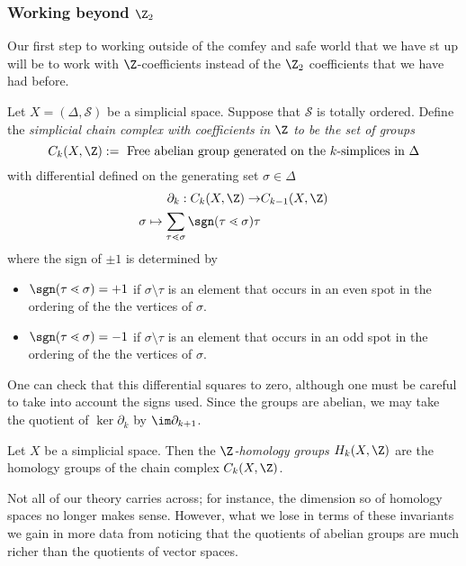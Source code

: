 \begin{example}
\end{example}
\subsubsection{Working beyond $\Z_2$}
Our first step to working outside of the comfey and safe world that we have st up will be to work with $\Z$-coefficients instead of the $\Z_2$ coefficients that we have had before. 
\begin{definition}
Let $X=(\Delta, \mathcal S)$ be a simplicial space. Suppose that $\mathcal S$ is totally ordered.  Define the \emph{simplicial chain complex with coefficients in $\Z$ to be the set of groups}
\[C_k(X, \Z):= \text{ Free abelian group generated on the $k$-simplices in $\Delta$}\]
with differential defined on the generating set  $\sigma\in \Delta$
\begin{align*}
\partial_k: C_k(X, \Z)\to& C_{k-1}(X, \Z)\\
\sigma \mapsto \sum_{\tau\lessdot \sigma} \sgn(\tau\lessdot \sigma)\tau
\end{align*}
where the sign of $\pm1$ is determined by 
\begin{itemize}
\item $\sgn(\tau\lessdot\sigma)=+1$ if $\sigma\setminus \tau$ is an element that occurs in an even spot in the ordering of the the vertices of $\sigma$.
\item  $\sgn(\tau\lessdot\sigma)=-1$ if $\sigma\setminus \tau$ is an element that occurs in an odd spot in the ordering of the the vertices of $\sigma$.  
\end{itemize}
\end{definition}
One can check that this differential squares to zero, although one must be careful to take into account the signs used. Since the groups are abelian, we may take the quotient of $\ker \partial_k$ by $\im \partial_{k+1}$.  \\
\begin{definition}
Let $X$ be a simplicial space. Then the \emph{$\Z$-homology groups $H_k(X, \Z)$} are the homology groups of the chain complex $C_k(X, \Z)$. 
\end{definition}
Not all of our theory carries across; for instance, the dimension so of homology spaces no longer makes sense. However, what we lose in terms of these invariants we gain in more data from noticing that the quotients of abelian groups are much richer than the quotients of vector spaces. 


